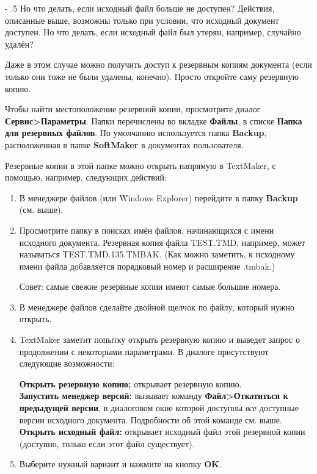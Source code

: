 ﻿\documentclass[a4paper,10pt]{article}
\makeatletter
\renewcommand\paragraph{%
   \@startsection{paragraph}{4}{0mm}%
      {-\baselineskip}%
      {.5\baselineskip}%
      {\normalfont\normalsize\bfseries}}
\makeatother
\begin{document}
\paragraph{Но что делать, если исходный файл больше не доступен?}
Действия, описанные выше, возможны только при условии, что исходный документ доступен. Но что делать, если исходный файл был утерян, например, случайно удалён?

Даже в этом случае можно получить доступ к резервным копиям документа (если только они тоже не были удалены, конечно). Просто откройте саму резервную копию.

Чтобы найти местоположение резервной копии, просмотрите диалог \textbf{Сервис>Параметры}. Папки перечислены во вкладке \textbf{Файлы}, в списке \textbf{Папка для резервных файлов}. По умолчанию используется папка \textbf{Backup}, расположенная в папке \textbf{SoftMaker} в документах пользователя.

Резервные копии в этой папке можно открыть напрямую в TextMaker, с помощью, например, следующих действий:
\begin{enumerate}
 \item В менеджере файлов (или Windows Explorer) перейдите в папку \textbf{Backup} (см. выше).
 \item Просмотрите папку в поисках имён файлов, начинающихся с имени исходного документа. Резервная копия файла TEST.TMD, например, может называться TEST.TMD.135.TMBAK. (Как можно заметить, к исходному имени файла добавляется порядковый  номер и расширение .tmbak.) 
 
 Совет: самые свежие резервные копии имеют самые большие номера.
 \item В менеджере файлов сделайте двойной щелчок по файлу, который нужно открыть.
 \item TextMaker заметит попытку открыть резервную копию и выведет запрос о продолжении с некоторыми параметрами. В диалоге присутствуют следующие возможности:
 
 \textbf{Открыть резервную копию:} открывает резервную копию.\\
 \textbf{Запустить менеджер версий:} вызывает команду \textbf{Файл>Откатиться к предыдущей версии}, в диалоговом окне которой доступны \textit{все} доступные версии исходного документа. Подробности об этой команде см. выше.\\
 \textbf{Открыть исходный файл:} открывает исходный файл этой резервной копии (доступно, только если этот файл существует).
 \item Выберите нужный вариант и нажмите на кнопку \textbf{OK}.
\end{enumerate}
\end{document}
